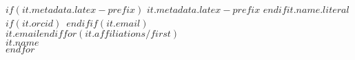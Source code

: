 $if(it.metadata.latex-prefix)$ $it.metadata.latex-prefix$ $endif$$it.name.literal$$if(it.orcid)$~$endif$$if(it.email)$\\$it.email$$endif$$for(it.affiliations/first)$\\\href{$it.url$}{$it.name$}\\\vspace{1cm}$endfor$